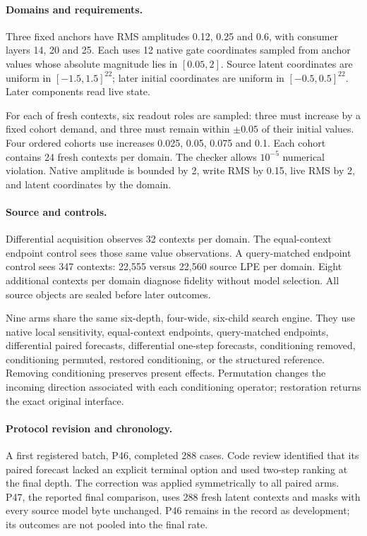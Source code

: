 \documentclass[11pt]{article}
\begin{document}
\paragraph{Domains and requirements.}
Three fixed anchors have RMS amplitudes 0.12, 0.25 and 0.6, with consumer layers
14, 20 and 25. Each uses 12 native gate coordinates sampled from anchor values
whose absolute magnitude lies in $[0.05,2]$. Source latent coordinates are
uniform in $[-1.5,1.5]^{22}$; later initial coordinates are uniform in
$[-0.5,0.5]^{22}$. Later components read live state.

For each of \TestConditions{} fresh contexts, six readout roles are sampled:
three must increase by a fixed cohort demand, and three must remain within
$\pm0.05$ of their initial values. Four ordered cohorts use increases
0.025, 0.05, 0.075 and 0.1. Each cohort contains 24 fresh contexts per domain.
The checker allows $10^{-5}$ numerical violation. Native amplitude is bounded
by 2, write RMS by 0.15, live RMS by 2, and latent coordinates by the domain.

\paragraph{Source and controls.}
Differential acquisition observes 32 contexts per domain. The equal-context
endpoint control sees those same value observations. A query-matched endpoint
control sees 347 contexts: 22,555 versus 22,560 source LPE per domain.
Eight additional contexts per domain diagnose fidelity without model selection.
All source objects are sealed before later outcomes.

Nine arms share the same six-depth, four-wide, six-child search engine. They
use native local sensitivity, equal-context endpoints, query-matched endpoints,
differential paired forecasts, differential one-step forecasts, conditioning
removed, conditioning permuted, restored conditioning, or the structured
reference. Removing conditioning preserves present effects. Permutation
changes the incoming direction associated with each conditioning operator;
restoration returns the exact original interface.

\paragraph{Protocol revision and chronology.}
A first registered batch, P46, completed 288 cases. Code review identified
that its paired forecast lacked an explicit terminal option and used two-step
ranking at the final depth. The correction was applied symmetrically to all
paired arms. P47, the reported final comparison, uses 288 fresh latent
contexts and masks with every source model byte unchanged. P46 remains in the
record as development; its outcomes are not pooled into the final rate.
\end{document}
